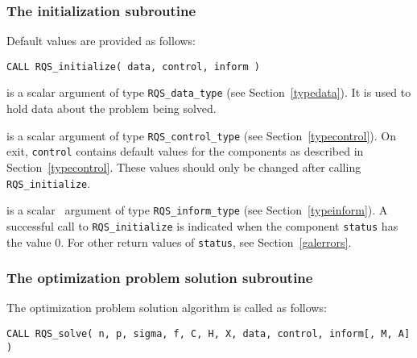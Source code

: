 \documentclass{galahad}
\newcommand{\packagename}{RQS}
\begin{document}

\subsubsection{The initialization subroutine}\label{subinit}
 Default values are provided as follows:

\hskip0.5in
{\tt CALL \packagename\_initialize( data, control, inform )}

\begin{description}

 is a scalar \intentinout argument of type
{\tt \packagename\_data\_type}
(see Section~\ref{typedata}). It is used to hold data about the problem being
solved.

 is a scalar \intentout argument of type
{\tt \packagename\_control\_type}
(see Section~\ref{typecontrol}).
On exit, {\tt control} contains default values for the components as
described in Section~\ref{typecontrol}.
These values should only be changed after calling
{\tt \packagename\_initialize}.

 is a scalar \intentout\ argument of type
{\tt \packagename\_inform\_type}
(see Section~\ref{typeinform}). A successful call to
{\tt \packagename\_initialize}
is indicated when the  component {\tt status} has the value 0.
For other return values of {\tt status}, see Section~\ref{galerrors}.

\end{description}


\subsubsection{The optimization problem solution subroutine}
The optimization problem solution algorithm is called as follows:

\hskip0.5in
{\tt CALL \packagename\_solve( n, p, sigma, f, C, H, X, data, control,
 inform[, M, A] )}
\end{document}
